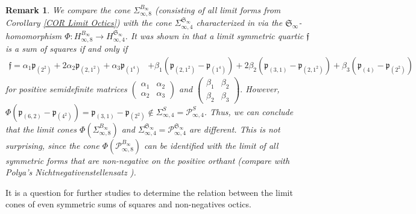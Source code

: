 \documentclass[11pt,a4paper]{amsart}
\numberwithin{equation}{section}
\newtheorem{remark}[thm]{Remark}
\theoremstyle{definition}
\numberwithin{thm}{section}
\theoremstyle{break}
\numberwithin{subcase}{case}
\begin{document}
\begin{remark}
We compare the cone $\Sigma_{\infty,8}^{B_\infty}$ (consisting of all limit forms from Corollary \ref{COR Limit Octics}) with the cone $\Sigma_{\infty,4}^{\mathfrak{S}_\infty}$ characterized in \cite{blekrie} via the $\mathfrak{S}_{\infty}$-homomorphism $\Phi : H_{\infty,8}^{B_\infty}\rightarrow H_{\infty,4}^{\mathfrak{S}_\infty}$. 
It was shown in \cite{blekherman2012nonnegative} that a limit symmetric quartic $\mathfrak{f}$ is a sum of squares if and only if \begin{align*}
     \mathfrak{f} = \alpha_1 \mathfrak{p}_{(2^2)} + 2 \alpha_2 \mathfrak{p}_{(2,1^2)}+ \alpha_3 \mathfrak{p}_{(1^4)}
    & + \beta_1 (\mathfrak{p}_{(2,1^2)}-\mathfrak{p}_{(1^4)})+2\beta_2 (\mathfrak{p}_{(3,1)}-\mathfrak{p}_{(2,1^2)})+\beta_3 (\mathfrak{p}_{(4)}-\mathfrak{p}_{(2^2)})
\end{align*} for positive semidefinite matrices $\left( \begin{array}{cc} \alpha_1 & \alpha_2 \\ \alpha_2 & \alpha_3 \end{array}\right)$ and $ \left( \begin{array}{cc} \beta_1 & \beta_2 \\ \beta_2 & \beta_3 \end{array}\right).$ However, $\Phi(\mathfrak{p}_{(6,2)}-\mathfrak{p}_{(4^2)})=\mathfrak{p}_{(3,1)}-\mathfrak{p}_{(2^2)} \not \in \Sigma_{\infty,4}^S = \mathcal{P}_{\infty,4}^{S}$. Thus, we can conclude that the limit cones $\Phi \left( \Sigma_{\infty,8}^{B_\infty}\right)$ and $\Sigma_{\infty,4}^{\mathfrak{S}_\infty} = \mathcal{P}_{\infty,4}^{\mathfrak{S}_\infty}$ are different. This is not surprising, since the cone $\Phi \left( \mathcal{P}_{\infty,8}^{B_\infty}\right)$ can be identified with the limit of all symmetric forms that are non-negative on the positive orthant (compare with Polya's Nichtnegativenstellensatz \cite{polya1928positive}). 
\end{remark}
 It is a question for further studies to determine the relation between the limit cones of even symmetric sums of squares and non-negatives octics.
 
\end{document}
